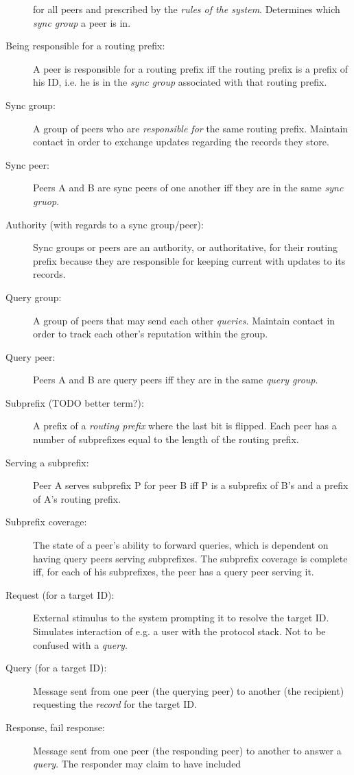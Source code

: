 \begin{description}
for all peers and prescribed by the \emph{rules of the system}. Determines which
\emph{sync group} a peer is in.
\item[Being responsible for a routing prefix:] A peer is responsible for a
routing prefix iff the routing prefix is a prefix of his ID, i.e. he is in the
\emph{sync group} associated with that routing prefix.
\item[Sync group:] A group of peers who are \emph{responsible for} the same
routing prefix. Maintain contact in order to exchange updates regarding the
records they store.
\item[Sync peer:] Peers A and B are sync peers of one another iff they are in
the same \emph{sync gruop}.
\item[Authority (with regards to a sync group/peer):] Sync groups or peers are
an authority, or authoritative, for their routing prefix because they are
responsible for keeping current with updates to its records.
\item[Query group:] A group of peers that may send each other \emph{queries}.
Maintain contact in order to track each other's reputation within the group.
\item[Query peer:] Peers A and B are query peers iff they are in the same
\emph{query group}.
\item[Subprefix (TODO better term?):] A prefix of a \emph{routing prefix} where
the last bit is flipped. Each peer has a number of subprefixes equal to the
length of the routing prefix.
\item[Serving a subprefix:] Peer A serves subprefix P for peer B iff P is a
subprefix of B's and a prefix of A's routing prefix.
\item[Subprefix coverage:] The state of a peer's ability to forward queries,
which is dependent on having query peers serving subprefixes. The subprefix
coverage is complete iff, for each of his subprefixes, the peer has a query peer
serving it.
\item[Request (for a target ID):] External stimulus to the system prompting it
to resolve the target ID. Simulates interaction of e.g. a user with the protocol
stack. Not to be confused with a \emph{query}.
\item[Query (for a target ID):] Message sent from one peer (the querying peer)
to another (the recipient) requesting the \emph{record} for the target ID.
\item[Response, fail response:] Message sent from one peer (the responding peer)
to another to answer a \emph{query}. The responder may claim to have included

\end{description}
